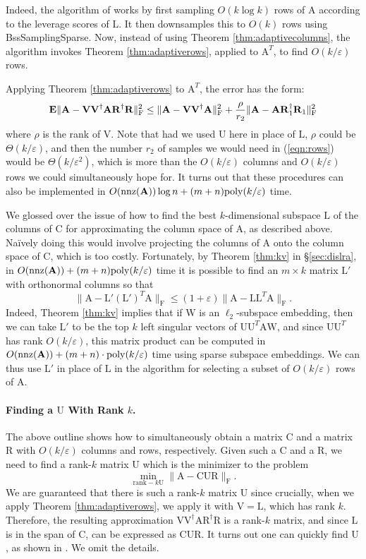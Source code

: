 \documentclass[11pt]{article}
\newcommand{\FNorm }[1]{\mbox{}\|#1\|_\mathrm{F}  }
\newcommand{\FNormS}[1]{\mbox{}\|#1\|_\mathrm{F}^2}
\newcommand{\pinv}[1]{ {#1}^\dagger}
\newcommand{\mat}[1]{{\ensuremath{\bm{\mathrm{#1}}}}}
\def\matA{\mat{A}}
\def\matC{\mat{C}}
\def\matL{\mat{L}}
\def\matR{\mat{R}}
\def\matU{\mat{U}}
\def\matV{\mat{V}}
\def\matW{\mat{W}}
\def\nnz{{ \rm nnz }}
\def\frac#1#2{{#1\over #2}}
\newcommand{\eps}{\varepsilon}
\newcommand{\poly}{{\mathrm{poly}}}
\begin{document}
Indeed, the algorithm of \cite{BW14} works by first sampling $O(k \log k)$ rows of $\matA$ according
to the leverage scores of $\matL$. It then downsamples this to $O(k)$ rows using {\textsc BssSamplingSparse}. Now,
instead of using Theorem \ref{thm:adaptivecolumns}, the algorithm invokes Theorem \ref{thm:adaptiverows}, applied to
$\matA^T$, to find $O(k/\eps)$ rows. 

Applying Theorem \ref{thm:adaptiverows} to $\matA^T$, the error has the form:
\begin{eqnarray}\label{eqn:rows}
{\bf E} \FNormS{ \matA - \matV\pinv{\matV}\matA \pinv{\matR}\matR } 
\le \FNormS{\matA - \matV\pinv{\matV}\matA } + \frac{\rho}{r_2} \FNormS{\matA - \matA\pinv{\matR}_1\matR_1}
\end{eqnarray}
where $\rho$ is the rank of $\matV$. Note that had we used $\matU$ here in place of $\matL$, $\rho$ could be $\Theta(k/\eps)$,
and then the number $r_2$ of samples we would need in (\ref{eqn:rows}) would be $\Theta(k/\eps^2)$, which is more than
the $O(k/\eps)$ columns and $O(k/\eps)$ rows we could simultaneously hope for. It turns out that these procedures
can also be implemented in $O(\nnz(\matA))\log n + (m+n)\poly(k/\eps)$ time.

We glossed over the issue of how to find the best $k$-dimensional subspace $\matL$ of the columns of $\matC$ for approximating
the column space of $\matA$, as described above. Na\"ively doing this would involve projecting the columns of $\matA$
onto the column space of $\matC$, which is too costly. Fortunately, by Theorem \ref{thm:kv}
in \S\ref{sec:dislra}, 
in $O(\nnz(\matA)) + (m+n)\poly(k/\eps)$ time it is 
possible to find an $m \times k$ matrix $\matL'$ with orthonormal columns so that
$$\FNorm{\matA - \matL'(\matL')^T\matA} \leq (1+\eps)\FNorm{\matA-\matL\matL^T \matA}.$$
Indeed, Theorem \ref{thm:kv} implies that if $\matW$ is an $\ell_2$-subspace embedding, then we can take
$\matL'$ to be the top $k$ left singular vectors of $\matU\matU^T\matA\matW$, and since $\matU\matU^T$ has rank $O(k/\eps)$,
this matrix product can be computed in $O(\nnz(\matA)) + (m+n) \cdot \poly(k/\eps)$ time using sparse subspace embeddings.  
We can thus use $\matL'$ in place of $\matL$ in the algorithm for selecting a subset of $O(k/\eps)$ rows of $\matA$. 

\paragraph{Finding a $\matU$ With Rank $k$.}
The above outline shows how to simultaneously obtain a matrix $\matC$ and a matrix $\matR$ with $O(k/\eps)$ columns
and rows, respectively. Given such a $\matC$ and a $\matR$, we need to find a rank-$k$ matrix $\matU$ which is the
minimizer to the problem
$$\min_{\textrm{rank}-k \matU}\FNorm{\matA - \matC\matU\matR}.$$
We are guaranteed that there is such a rank-$k$ matrix $\matU$ since crucially, when we apply 
Theorem \ref{thm:adaptiverows}, we apply it with $\matV = \matL$, which has rank $k$. Therefore, the resulting
approximation $\matV\pinv{\matV}\matA\pinv{\matR}\matR$ is a rank-$k$ matrix, and since $\matL$ is in the span
of $\matC$, can be expressed as $\matC\matU\matR$. It turns out one can quickly find $\matU$, as shown in \cite{BW14}. We omit the details. 
\end{document}
